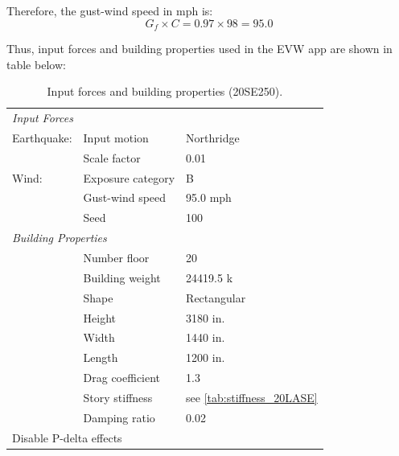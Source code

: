 \documentclass{simcenterdocumentation}
\begin{document}
Therefore, the gust-wind speed in mph is:
\begin{equation*}
G_f \times C = 0.97 \times 98 = \boxed{95.0}
\end{equation*}

Thus, input forces and building properties used in the EVW app are shown in table below:

\begin{table}[H]
	\centering \caption{Input forces and building properties (20SE250).}
	\begin{tabular}{lll}
	\toprule
	\multicolumn{3}{l}{\textit{Input Forces}}					\\
	\cmidrule(rl){1-3}
	Earthquake:		& Input motion		& Northridge			\\
					& Scale factor		& 0.01					\\
	Wind:			& Exposure category	& B						\\
					& Gust-wind speed	& 95.0 mph				\\
					& Seed				& 100					\\
	\midrule
	\multicolumn{3}{l}{\textit{Building Properties}}			\\
	\cmidrule(rl){1-3}
					& Number floor		& 20					\\
					& Building weight	& 24419.5 k				\\
					& Shape				& Rectangular			\\
					& Height			& 3180 in.				\\
					& Width				& 1440 in.				\\
					& Length			& 1200 in.				\\
					& Drag coefficient	& 1.3					\\
					& Story stiffness	& see \cref{tab:stiffness_20LASE}			\\
					& Damping ratio		& 0.02					\\
	\midrule
	\multicolumn{3}{l}{Disable P-delta effects}					\\
	\bottomrule
	\end{tabular}
\end{table}
\end{document}
